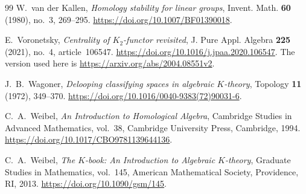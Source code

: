 \documentclass[11pt]{amsart}
\theoremstyle{definition}
\theoremstyle{remark}
\numberwithin{equation}{section}
\begin{document}
\begin{thebibliography}{99}
W.~van der Kallen, \emph{Homology stability for linear groups}, Invent. Math. \textbf{60} (1980), no.~3, 269--295. \url{https://doi.org/10.1007/BF01390018}.

E.~Voronetsky, \emph{Centrality of $K_2$-functor revisited}, J. Pure Appl. Algebra \textbf{225} (2021), no.~4, article~106547. \url{https://doi.org/10.1016/j.jpaa.2020.106547}. The version used here is \url{https://arxiv.org/abs/2004.08551v2}.

J.~B.~Wagoner, \emph{Delooping classifying spaces in algebraic $K$-theory}, Topology \textbf{11} (1972), 349--370. \url{https://doi.org/10.1016/0040-9383(72)90031-6}.

C.~A.~Weibel, \emph{An Introduction to Homological Algebra}, Cambridge Studies in Advanced Mathematics, vol.~38, Cambridge University Press, Cambridge, 1994. \url{https://doi.org/10.1017/CBO9781139644136}.

C.~A.~Weibel, \emph{The $K$-book: An Introduction to Algebraic $K$-theory}, Graduate Studies in Mathematics, vol.~145, American Mathematical Society, Providence, RI, 2013. \url{https://doi.org/10.1090/gsm/145}.

\end{thebibliography}
\end{document}
